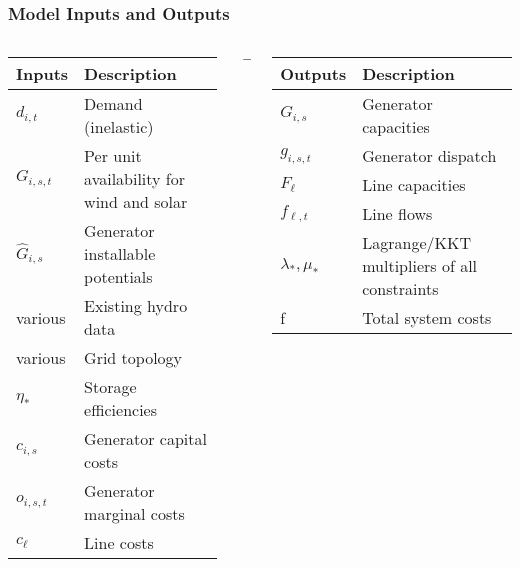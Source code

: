 \documentclass[10pt,aspectratio=169,dvipsnames]{beamer}
\begin{document}
\begin{frame}
\frametitle{Model Inputs and Outputs}

\begin{columns}
  \begin{column}{6cm}


    \begin{table}[!t]
	\centering
	\begin{tabular}{@{}p{1.15cm}p{4.54cm}@{}}
\toprule
\alert{Inputs} & Description \\
\midrule
$d_{i,t}$ & Demand (inelastic) \\
$G_{i,s,t}$ & Per unit availability for wind and solar \\
$\hat{G}_{i,s}$ & Generator installable potentials \\
various & Existing hydro data \\
various & Grid topology \\
$\eta_*$ & Storage efficiencies \\
$c_{i,s}$ & Generator capital costs \\
$o_{i,s,t}$ & Generator marginal costs \\
$c_\ell$ & Line costs \\
\bottomrule
	\end{tabular}
\end{table}
  \end{column}
    \begin{column}{1cm}


      \vspace{1cm}

      $\to$

    \end{column}
  \begin{column}{6cm}


    \begin{table}[!t]
	\centering
	\begin{tabular}{@{}p{1.15cm}p{4.54cm}@{}}
\toprule
\alert{Outputs} & Description \\
\midrule
$G_{i,s}$ &  Generator capacities \\
$g_{i,s,t}$ & Generator dispatch \\
$F_\ell$ & Line capacities \\
$f_{\ell,t}$ & Line flows \\
$\lambda_*,\mu_*$ & Lagrange/KKT multipliers of all constraints \\
f & Total system costs \\
\bottomrule
	\end{tabular}
\end{table}
  \end{column}

\end{columns}
\end{frame}
\end{document}
